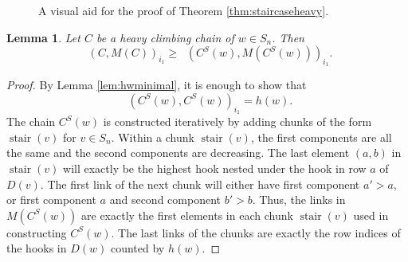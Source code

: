 \documentclass[11pt]{amsart}
\newtheorem{lemma}[theorem]{Lemma}
\theoremstyle{definition}
\theoremstyle{named}
\newcommand{\CS}{C^S}
\DeclareMathOperator{\stair}{\mathrm{stair}}
\DeclareMathOperator{\dwt}{\overline{\mathrm{wt}}}
\begin{document}
\begin{figure}[ht]
\begin{center}
			\caption{A visual aid for the proof of Theorem \ref{thm:staircaseheavy}.}
			\label{fig:staircase}
		\end{center}
	\end{figure}
	
	\begin{lemma}
		\label{lem:heavyminfirstmarks}
		Let $C$ be a heavy climbing chain of $w\in S_n$. Then
		\[\dwt(C,M(C))_{i_1}\geq \dwt(\CS(w),M(\CS(w)))_{i_1}. \]
	\end{lemma}
	\begin{proof}
		By Lemma \ref{lem:hwminimal}, it is enough to show that 
		\[\dwt(\CS(w),\CS(w))_{i_1} = h(w). \]
		The chain $\CS(w)$ is constructed iteratively by adding chunks of the form $\stair(v)$ for $v\in S_n$. Within a chunk $\stair(v)$, the first components are all the same and the second components are decreasing. The last element $(a,b)$ in $\stair(v)$ will exactly be the highest hook nested under the hook in row $a$ of $D(v)$. The first link of the next chunk will either have first component $a'>a$, or first component $a$ and second component $b'>b$. Thus, the links in $M(\CS(w))$ are exactly the first elements in each chunk $\stair(v)$ used in constructing $\CS(w)$. The last links of the chunks are exactly the row indices of the hooks in $D(w)$ counted by $h(w)$.
	\end{proof}
\end{document}
